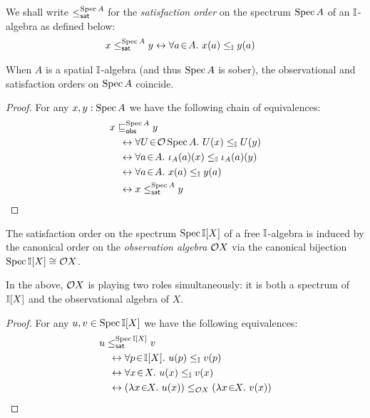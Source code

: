 \begin{definition}
  We shall write $\satle[\spec{A}]$ for the \emph{satisfaction order} on the spectrum $\operatorname{Spec}{A}$ of an $\mathbb{I}$-algebra as defined below:
  \begin{align*}
    x\satle[\spec{A}] y 
    &\eq \fa{a}{A}
    x(a) \le_\mbb{I} y(a) 
  \end{align*}
\end{definition}


\begin{observation}\label{lem:specorderofsober}
  When $A$ is a spatial $\mathbb{I}$-algebra (and thus $\operatorname{Spec}{A}$ is sober), the observational and satisfaction orders on $\operatorname{Spec}{A}$ coincide.
\end{observation}
\begin{proof}
  For any $x,y:\operatorname{Spec}{A}$ we have the following chain of equivalences:
  \begin{align*}
    &x\obsle[\spec{A}] y \\
    &\quad\eq 
    \fa{U}{\opens\spec{A}} U(x) \le_{\mbb{I}} U(y)
    \\ 
    &\quad\eq 
    \fa{a}{A} 
    \iota_A(a)(x)
    \le_\mbb{I}
    \iota_A(a)(y)
    \\ 
    &\quad\eq 
    \fa{a}{A} 
    x(a)
    \le_\mbb{I}
    y(a)
    \\ 
    &\quad\eq 
    x\satle[\spec{A}] y
    \qedhere
  \end{align*}
\end{proof}

\begin{observation}
  The satisfaction order on the spectrum $\operatorname{Spec}{\mathbb{I}[X]}$ of a free $\mathbb{I}$-algebra is induced by the canonical order on the \emph{observation algebra} $\mathcal{O}{X}$ via the canonical bijection $\operatorname{Spec}{\mathbb{I}[X]}\cong \mathcal{O}{X}$.
\end{observation}

In the above, $\mathcal{O}{X}$ is playing two roles simultaneously: it is both a spectrum of $\mathbb{I}[X]$ and the observational algebra of $X$.

\begin{proof}
  For any $u,v\in\operatorname{Spec}{\mathbb{I}[X]}$ we have the following equivalences:
  \begin{align*}
    &u \satle[\spec{\mbb{I}[X]}] v\\
    &\quad\eq \fa{p}{\mbb{I}[X]} u(p) \le_{\mbb{I}} v(p)
    \\ 
    &\quad\eq \fa{x}{X} u(x) \le_{\mbb{I}} v(x)
    \\ 
    &\quad\eq (\ld{x}{X}u(x)) \le_{\opens{X}} (\ld{x}{X}v(x))
    \qedhere
  \end{align*}
\end{proof}


